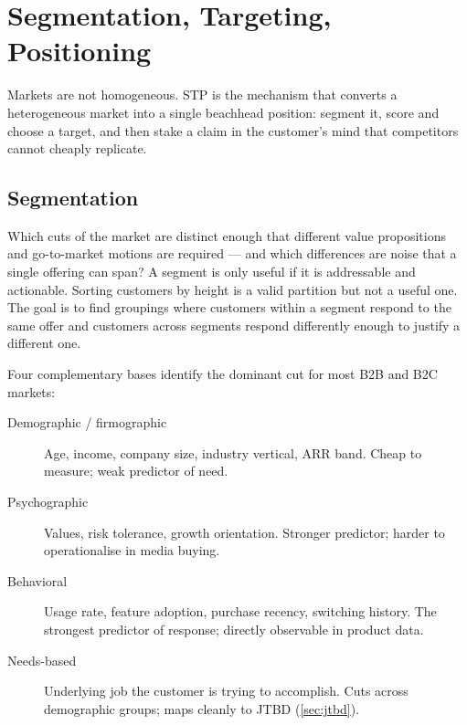 \chapter{Segmentation, Targeting, Positioning}\label{ch:segmentation-targeting-positioning}


Markets are not homogeneous. STP is the mechanism that converts a heterogeneous market into a single beachhead position: segment it, score and choose a target, and then stake a claim in the customer's mind that competitors cannot cheaply replicate.

\section{Segmentation}\label{sec:segmentation}

Which cuts of the market are distinct enough that different value propositions and go-to-market motions are required --- and which differences are noise that a single offering can span? A segment is only useful if it is addressable and actionable. Sorting customers by height is a valid partition but not a useful one. The goal is to find groupings where customers within a segment respond to the same offer and customers across segments respond differently enough to justify a different one.

Four complementary bases identify the dominant cut for most B2B and B2C markets:

\begin{description}
  \item[Demographic / firmographic] Age, income, company size, industry vertical, ARR band. Cheap to measure; weak predictor of need.
  \item[Psychographic] Values, risk tolerance, growth orientation. Stronger predictor; harder to operationalise in media buying.
  \item[Behavioral] Usage rate, feature adoption, purchase recency, switching history. The strongest predictor of response; directly observable in product data.
  \item[Needs-based] Underlying job the customer is trying to accomplish. Cuts across demographic groups; maps cleanly to JTBD (\cref{sec:jtbd}).
\end{description}

